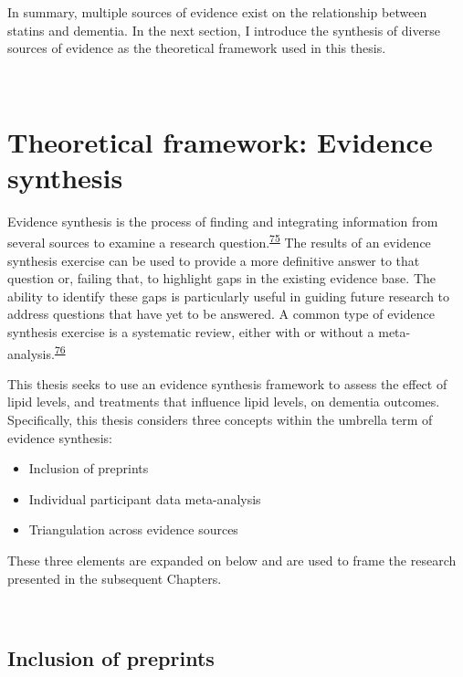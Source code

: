 \documentclass[a4paper, twoside]{templates/ociamthesis}
\providecommand{\tightlist}{%
  \setlength{\itemsep}{0pt}\setlength{\parskip}{0pt}}
\begin{document}
In summary, multiple sources of evidence exist on the relationship between statins and dementia. In the next section, I introduce the synthesis of diverse sources of evidence as the theoretical framework used in this thesis.

~

\hypertarget{theoretical-framework-evidence-synthesis}{%
\section{Theoretical framework: Evidence synthesis}\label{theoretical-framework-evidence-synthesis}}

Evidence synthesis is the process of finding and integrating information from several sources to examine a research question.\textsuperscript{\protect\hyperlink{ref-donnelly2018}{75}} The results of an evidence synthesis exercise can be used to provide a more definitive answer to that question or, failing that, to highlight gaps in the existing evidence base. The ability to identify these gaps is particularly useful in guiding future research to address questions that have yet to be answered. A common type of evidence synthesis exercise is a systematic review, either with or without a meta-analysis.\textsuperscript{\protect\hyperlink{ref-chandler2019chapter}{76}}

This thesis seeks to use an evidence synthesis framework to assess the effect of lipid levels, and treatments that influence lipid levels, on dementia outcomes. Specifically, this thesis considers three concepts within the umbrella term of evidence synthesis:

\begin{itemize}
\tightlist
\item
  Inclusion of preprints
\item
  Individual participant data meta-analysis
\item
  Triangulation across evidence sources
\end{itemize}

These three elements are expanded on below and are used to frame the research presented in the subsequent Chapters.

~

\hypertarget{diverse-sources-preprints}{%
\subsection{Inclusion of preprints}\label{diverse-sources-preprints}}
\end{document}
